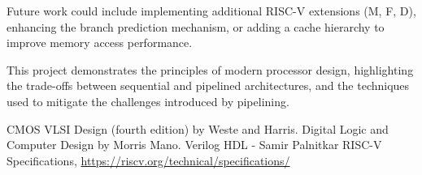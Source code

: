\documentclass[conference]{IEEEtran}
\begin{document}
Future work could include implementing additional RISC-V extensions (M, F, D), enhancing the branch prediction mechanism, or adding a cache hierarchy to improve memory access performance.

This project demonstrates the principles of modern processor design, highlighting the trade-offs between sequential and pipelined architectures, and the techniques used to mitigate the challenges introduced by pipelining.

\begin{thebibliography}{00}
 CMOS VLSI Design (fourth edition) by Weste and Harris.
 Digital Logic and Computer Design by Morris Mano.
 Verilog HDL - Samir Palnitkar
 RISC-V Specifications, \url{https://riscv.org/technical/specifications/}
\end{thebibliography}
\end{document}
